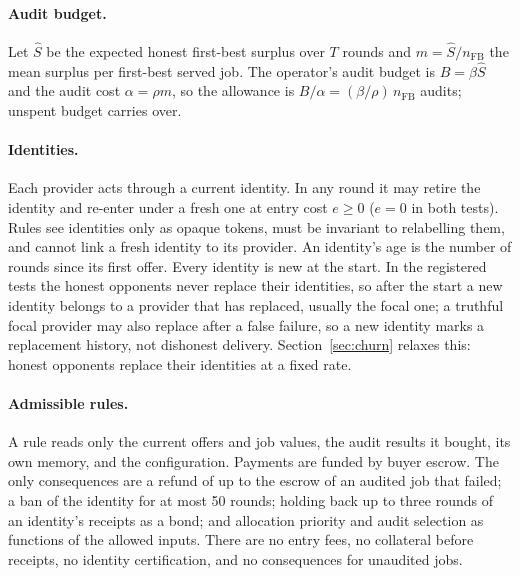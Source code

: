 \documentclass[11pt]{article}
\begin{document}
\paragraph{Audit budget.} Let $\hat S$ be the expected honest first-best surplus over $T$ rounds and $m = \hat S / n_{\mathrm{FB}}$ the mean surplus per first-best served job. The operator's audit budget is $B = \beta \hat S$ and the audit cost $\alpha = \rho m$, so the allowance is $B/\alpha = (\beta/\rho)\, n_{\mathrm{FB}}$ audits; unspent budget carries over.

\paragraph{Identities.} Each provider acts through a current identity. In any round it may retire the identity and re-enter under a fresh one at entry cost $e \ge 0$ ($e = 0$ in both tests). Rules see identities only as opaque tokens, must be invariant to relabelling them, and cannot link a fresh identity to its provider. An identity's age is the number of rounds since its first offer. Every identity is new at the start. In the registered tests the honest opponents never replace their identities, so after the start a new identity belongs to a provider that has replaced, usually the focal one; a truthful focal provider may also replace after a false failure, so a new identity marks a replacement history, not dishonest delivery. Section~\ref{sec:churn} relaxes this: honest opponents replace their identities at a fixed rate.

\paragraph{Admissible rules.} A rule reads only the current offers and job values, the audit results it bought, its own memory, and the configuration. Payments are funded by buyer escrow. The only consequences are a refund of up to the escrow of an audited job that failed; a ban of the identity for at most 50 rounds; holding back up to three rounds of an identity's receipts as a bond; and allocation priority and audit selection as functions of the allowed inputs. There are no entry fees, no collateral before receipts, no identity certification, and no consequences for unaudited jobs.
\end{document}

